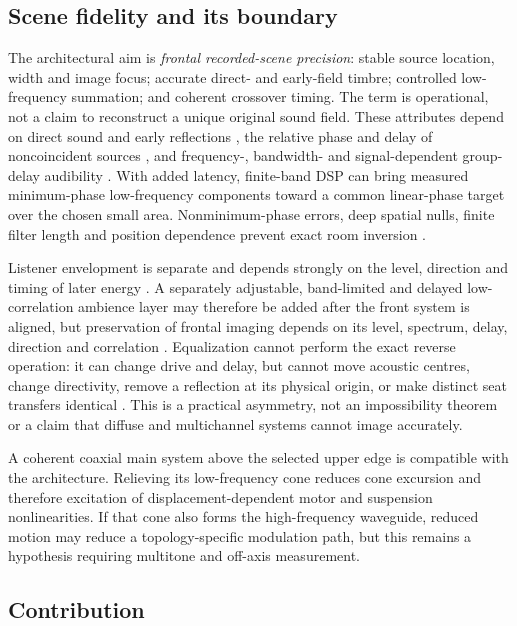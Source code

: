 \documentclass[11pt,a4paper]{article}
\numberwithin{equation}{section}
\begin{document}
\subsection{Scene fidelity and its boundary}
\label{sec:intro-fidelity}

The architectural aim is \emph{frontal recorded-scene precision}: stable
source location, width and image focus; accurate direct- and early-field
timbre; controlled low-frequency summation; and coherent crossover timing.
The term is operational, not a claim to reconstruct a unique original sound
field.  These attributes depend on direct sound and early reflections
\cite{toole2006,bech1998}, the relative phase and delay of noncoincident
sources \cite{linkwitz1976}, and frequency-, bandwidth- and
signal-dependent group-delay audibility \cite{blauert1978}.  With added
latency, finite-band DSP can bring measured minimum-phase low-frequency
components toward a common linear-phase target over the chosen small area.
Nonminimum-phase errors, deep spatial nulls, finite filter length and
position dependence prevent exact room inversion
\cite{neely1979,cecchi2018}.

Listener envelopment is separate and depends strongly on the level,
direction and timing of later energy
\cite{bradley1995,rumsey2002,soulodre2003}.  A separately adjustable,
band-limited and delayed low-correlation ambience layer may therefore be
added after the front system is aligned, but preservation of frontal
imaging depends on its level, spectrum, delay, direction and correlation
\cite{kendall1995,litovsky1999}.  Equalization cannot perform the exact
reverse operation: it can change drive and delay, but cannot move acoustic
centres, change directivity, remove a reflection at its physical origin, or
make distinct seat transfers identical
\cite{neely1979,elliott1989,welti2006,cecchi2018}.  This is a practical
asymmetry, not an impossibility theorem or a claim that diffuse and
multichannel systems cannot image accurately.

A coherent coaxial main system above the selected upper edge is compatible
with the architecture.  Relieving its low-frequency cone reduces cone
excursion and therefore excitation of displacement-dependent motor and
suspension nonlinearities.  If that cone also forms the high-frequency
waveguide, reduced motion may reduce a topology-specific modulation path,
but this remains a hypothesis requiring multitone and off-axis measurement.

\subsection{Contribution}
\label{sec:intro-contribution}
\end{document}
